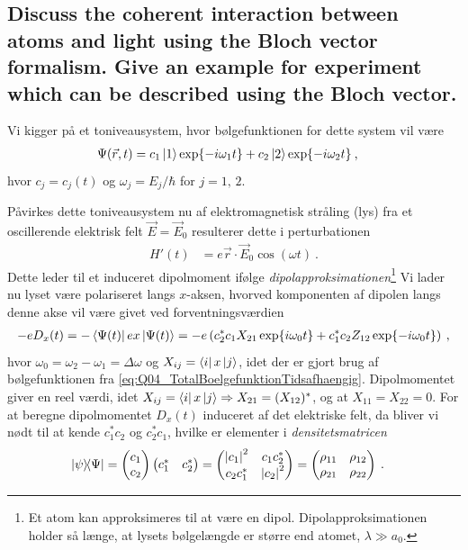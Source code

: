 \subsection{Discuss the coherent interaction between atoms and light using the Bloch vector formalism. Give an example for experiment which can be described using the Bloch vector.}


Vi kigger på et toniveausystem, hvor bølgefunktionen for dette system vil være
\begin{align} \label{eq:Q04_TotalBoelgefunktionTidsafhaengig}
    \Psi(\Vec{r},t) &= c_1\ket{1}\exp{-i\omega_1 t} + c_2\ket{2}\exp{-i\omega_2 t} \: ,
\end{align}
hvor $c_j = c_j(t)$ og $\omega_j = E_j/\hbar$ for $j = 1,\,2$.

Påvirkes dette toniveausystem nu af elektromagnetisk stråling (lys) fra et oscillerende elektrisk felt $\Vec{E} = \Vec{E}_0$ resulterer dette i perturbationen
\begin{align}
    H'(t) &= e\Vec{r} \cdot \Vec{E}_0 \cos(\omega t) \: .
\end{align}
Dette leder til et induceret dipolmoment ifølge \emph{dipolapproksimationen}\footnote{Et atom kan approksimeres til at være en dipol. Dipolapproksimationen holder så længe, at lysets bølgelængde er større end atomet, $\lambda \gg a_0$.} Vi lader nu lyset være polariseret langs $x$-aksen, hvorved komponenten af dipolen langs denne akse vil være givet ved forventningsværdien
\begin{align} \label{eq:Q04_ElektronladningGangeInduceretDipolmoment}
    -eD_x(t) = -\bra{\Psi(t)}ex\ket{\Psi(t)} = -e\left(c_2^*c_1X_{21}\exp{i\omega_0 t} + c_1^*c_2Z_{12}\exp{-i\omega_0 t}\right) \: ,
\end{align}
hvor $\omega_0 = \omega_2 - \omega_1 = \Delta \omega$ og $X_{ij} = \bra{i}x\ket{j}$, idet der er gjort brug af bølgefunktionen fra \cref{eq:Q04_TotalBoelgefunktionTidsafhaengig}. Dipolmomentet giver en reel værdi, idet $X_{ij} = \bra{i}x\ket{j} \Rightarrow X_{21} = (X_{12})^*$, og at $X_{11} = X_{22} = 0$. For at beregne dipolmomentet $D_x(t)$ induceret af det elektriske felt, da bliver vi nødt til at kende $c_1^*c_2$ og $c_2^*c_1$, hvilke er elementer i \emph{densitetsmatricen}
\begin{align} \label{eq:Q04_DensityMatrix}
    \ketbra{\psi}{\Psi} &=
        \begin{pmatrix}
            c_1 \\
            c_2
        \end{pmatrix}
        \begin{pmatrix}
            c_1^* & c_2^*
        \end{pmatrix}
    = \begin{pmatrix}
            \abs{c_1}^2 & c_1c_2^* \\
            c_2c_1^* & \abs{c_2}^2
        \end{pmatrix}
    = \begin{pmatrix}
            \rho_{11} & \rho_{12} \\
            \rho_{21} & \rho_{22} \\
        \end{pmatrix}
    \: .
\end{align}
